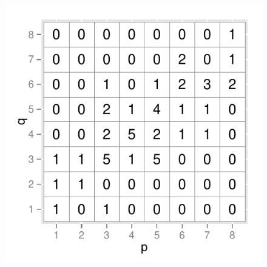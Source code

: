 \documentclass[12]{article}
\begin{document}
\begin{itemize}
\begin{figure}[hbtp]
{\includegraphics[scale=0.55]{freq-example-1.pdf}

}
\end{figure}
\end{itemize}
\end{document}
